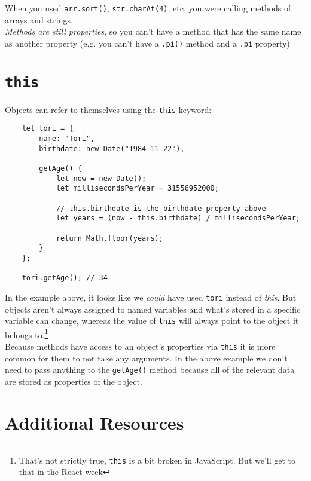 When you used \texttt{arr.sort()}, \texttt{str.charAt(4)}, etc. you were calling methods of arrays and strings.
\\

\textit{Methods are still properties}, so you can't have a method that has the same name as another property (e.g. you can't have a \texttt{.pi()} method and a \texttt{.pi} property)


\section{\texttt{this}}

Objects can refer to themselves using the \texttt{this} keyword:

\begin{verbatim}
    let tori = {
        name: "Tori",
        birthdate: new Date("1984-11-22"),

        getAge() {
            let now = new Date();
            let millisecondsPerYear = 31556952000;

            // this.birthdate is the birthdate property above
            let years = (now - this.birthdate) / millisecondsPerYear;

            return Math.floor(years);
        }
    };

    tori.getAge(); // 34
\end{verbatim}

In the example above, it looks like we \textit{could} have used \texttt{tori} instead of \textit{this}. But objects aren't always assigned to named variables and what's stored in a specific variable can change, whereas the value of \texttt{this} will always point to the object it belongs to.\footnote{That's not strictly true, \texttt{this} is a bit broken in JavaScript. But we'll get to that in the React week}
\\

Because methods have access to an object's properties via \texttt{this} it is more common for them to not take any arguments. In the above example we don't need to pass anything to the \texttt{getAge()} method because all of the relevant data are stored as properties of the object.

\pagebreak

\section{Additional Resources}

